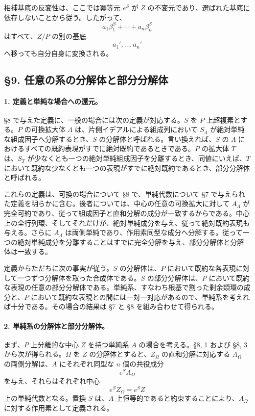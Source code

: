 相補基底の反変性は、ここでは冪等元 \(e^S\) が \(Z\) の不変元であり、選ばれた基底に依存しないことから従う。したがって、
\[
        a_1\beta_1^S+\cdots+a_n\beta_n^S
\]
はすべて、\(Z/P\) の別の基底
\[
        a_1',\ldots,a_n'
\]
へ移っても自分自身に変換される。

\subsection*{§9. 任意の系の分解体と部分分解体}

\paragraph{1. 定義と単純な場合への還元。}
§8 で与えた定義に、一般の場合には次の定義が対応する。\(S\) を \(P\) 上超複素とする。\(P\) の可換拡大体 \(\Lambda\) は、片側イデアルによる組成列において \(S_\Lambda\) が絶対単純な組成因子へ分解するとき、\(S\) の分解体と呼ばれる。言い換えれば、\(S\) の \(\Lambda\) におけるすべての既約表現がすでに絶対既約であるときである。\(P\) の拡大体 \(T\) は、\(S_T\) が少なくとも一つの絶対単純組成因子を分離するとき、同値にいえば、\(T\) において既約な少なくとも一つの表現がすでに絶対既約であるとき、部分分解体と呼ばれる。

これらの定義は、可換の場合について §8 で、単純代数について §7 で与えられた定義を明らかに含む。後者については、中心の任意の可換拡大に対して \(A_\Lambda\) が完全可約であり、従って組成因子と直和分解の成分が一致するからである。中心上の全行列環、そしてそれだけが、絶対単純成分を与え、従って絶対既約表現も与える。さらに \(A_\Lambda\) は両側単純であり、作用素同型な成分へ分解する。従って一つの絶対単純成分を分離することはすでに完全分解を与え、部分分解体と分解体は一致する。

定義からただちに次の事実が従う。\(S\) の分解体は、\(P\) において既約な各表現に対して一つずつ分解体を取った合成体である。\(S\) の部分分解体は、\(P\) において既約な表現の任意の部分分解体である。単純系、すなわち根基で割った剰余類環の成分と、\(P\) において既約な表現との間には一対一対応があるので、単純系を考えれば十分である。その場合の結果は §7 と §8 を組み合わせて得られる。

\paragraph{2. 単純系の分解体と部分分解体。}
まず、\(P\) 上分離的な中心 \(Z\) を持つ単純系 \(A\) の場合を考える。§8, 1 および §8, 3 から次が得られる。\(\Omega\) を \(Z\) の分解体とすると、\(Z_\Omega\) の直和分解に対応する \(A_\Omega\) の両側分解は、\(A\) にそれぞれ同型な \(n\) 個の共役成分
\[
        e^S A_\Omega
\]
を与え、それらはそれぞれ中心
\[
        e^S Z_\Omega=e^S Z
\]
上の単純代数となる。置換 \(S\) は、\(A\) 上恒等的であると約束することにより、\(A_\Omega\) に対する作用素として定義される。


